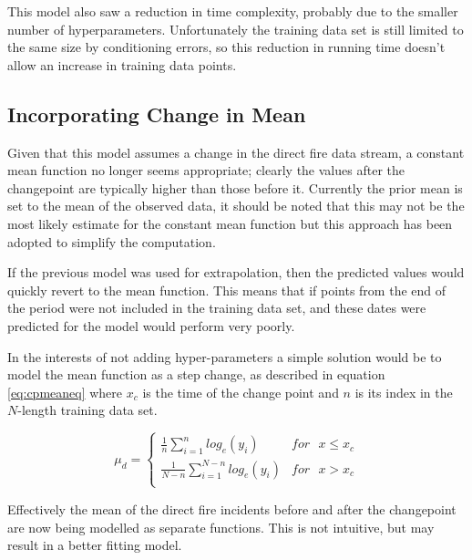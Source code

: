 \documentclass[a4paper,11pt]{report}
\begin{document}
This model also saw a reduction in time complexity, probably due to the smaller number of hyperparameters. Unfortunately the training data set is still limited to the same size by conditioning errors, so this reduction in running time doesn't allow an increase in training data points.

\subsection{Incorporating Change in Mean}

Given that this model assumes a change in the direct fire data stream, a constant mean function no longer seems appropriate; clearly the values after the changepoint are typically higher than those before it. Currently the prior mean is set to the mean of the observed data, it should be noted that this may not be the most likely estimate for the constant mean function but this approach has been adopted to simplify the computation. \par

If the previous model was used for extrapolation, then the predicted values would quickly revert to the mean function. This means that if points from the end of the period were not included in the training data set, and these dates were predicted for the model would perform very poorly. \par

In the interests of not adding hyper-parameters a simple solution would be to model the mean function as a step change, as described in equation \ref{eq:cpmeaneq} where \(x_c\) is the time of the change point and \(n\) is its index in the \(N\)-length training data set.

\begin{equation} \label{eq:cpmeaneq}
\mu_d = \begin{cases}
\frac{1}{n} \displaystyle \sum_{i=1}^{n} log_e(y_i) & for \text{ } x \leq x_c \\
\frac{1}{N-n} \displaystyle \sum_{i=1}^{N-n} log_e(y_i) & for \text{ } x > x_c \\ 
\end{cases}
\end{equation}

Effectively the mean of the direct fire incidents before and after the changepoint are now being modelled as separate functions. This is not intuitive, but may result in a better fitting model. \par
\end{document}
